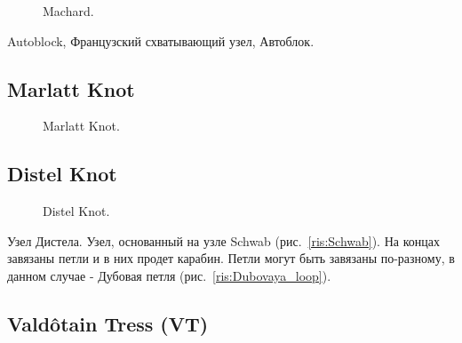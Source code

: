 \begin{figure}[H]\centering
	\begin{minipage}{1\linewidth}
		\begin{center}
			\tcbox[enhanced jigsaw,colframe=black,opacityframe=0.5,opacityback=0.5]
			{\centering{}}
		\end{center}
	\end{minipage}
\caption{Machard.}
\label{ris:Machard}
\end{figure}

Autoblock, Французский схватывающий узел, Автоблок.

\subsection{Marlatt Knot}

\begin{figure}[H]\centering
	\begin{minipage}{1\linewidth}
		\begin{center}
			\tcbox[enhanced jigsaw,colframe=black,opacityframe=0.5,opacityback=0.5]
			{\centering{}}
		\end{center}
	\end{minipage}
\caption{Marlatt Knot.}
\label{ris:Marlatt_Knot}
\end{figure}

\subsection{Distel Knot}

\begin{figure}[H]\centering
	\begin{minipage}{1\linewidth}
		\begin{center}
			\tcbox[enhanced jigsaw,colframe=black,opacityframe=0.5,opacityback=0.5]
			{\centering{}}
		\end{center}
	\end{minipage}
\caption{Distel Knot.}
\label{ris:Distel_Knot}
\end{figure}

Узел Дистела. Узел, основанный на узле Schwab (рис.~\ref{ris:Schwab}). На концах завязаны петли и в них продет карабин. Петли могут быть завязаны по-разному, в данном случае - Дубовая петля (рис.~\ref{ris:Dubovaya_loop}).

\subsection{Valdôtain Tress (VT)}

